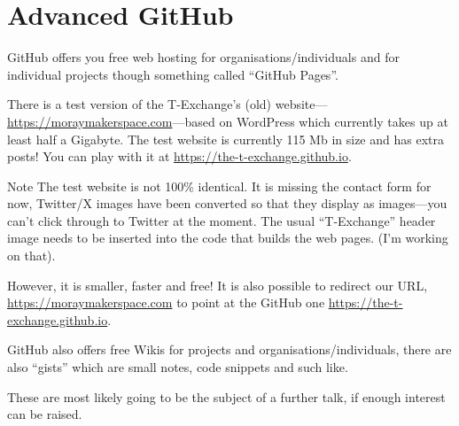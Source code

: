 \chapter{Advanced GitHub}\label{chap: Advanced GitHub}

GitHub offers you free web hosting for organisations/individuals and for individual projects though something called ``GitHub Pages''.

There is a test version of the T-Exchange's (old) website---\url{https://moraymakerspace.com}---based on WordPress which currently takes up at least half a Gigabyte. The test website is currently 115 Mb in size and has extra posts! You can play with it at \url{https://the-t-exchange.github.io}.

\begin{tips}{Note}
    The test website is not 100\% identical. It is missing the contact form for now, Twitter/X images have been converted so that they display as images---you can't click through to Twitter at the moment. The usual ``T-Exchange'' header image needs to be inserted into the code that builds the web pages. (I'm working on that).

    However, it is smaller, faster and free! It is also possible to redirect our URL, \url{https://moraymakerspace.com} to point at the GitHub one \url{https://the-t-exchange.github.io}.
\end{tips}


GitHub also offers free Wikis for projects and organisations/individuals, there are also ``gists'' which are small notes, code snippets and such like.

These are most likely going to be the subject of a further talk, if enough interest can be raised.